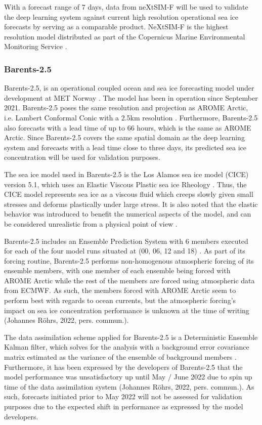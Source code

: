 \documentclass[../main/thesis.tex]{subfiles}
\begin{document}
With a forecast range of 7 days, data from neXtSIM-F will be used to validate the deep learning system against current high resolution operational sea ice forecasts by serving as a comparable product. NeXtSIM-F is the highest resolution model distributed as part of the Copernicus Marine Environmental Monitoring Service \citep{nextsimdata2020}.

\subsubsection{Barents-2.5}
\label{sec:barents}
Barents-2.5, is an operational coupled ocean and sea ice forecasting model under development at MET Norway \citep{Roehrs2022}. The model has been in operation since September 2021. Barents-2.5 poses the same resolution and projection as AROME Arctic, i.e. Lambert Conformal Conic with a 2.5km resolution \citep{Roehrs2022,Mueller2017}. Furthermore, Barents-2.5 also forecasts with a lead time of up to 66 hours, which is the same as AROME Arctic. Since Barents-2.5 covers the same spatial domain as the deep learning system and forecasts with a lead time close to three days, its predicted sea ice concentration will be used for validation purposes.

The sea ice model used in Barents-2.5 is the Los Alamos sea ice model (CICE) version 5.1, which uses an Elastic Viscous Plastic sea ice Rheology \citep{Hunke2015}. Thus, the CICE model represents sea ice as a viscous fluid which creeps slowly given small stresses and deforms plastically under large stress. It is also noted that the elastic behavior was introduced to benefit the numerical aspects of the model, and can be considered unrealistic from a physical point of view \citep{Hunke1997}.

Barents-2.5 includes an Ensemble Prediction System with 6 members executed for each of the four model runs situated at (00, 06, 12 and 18) \citep{Roehrs2022}. As part of its forcing routine, Barents-2.5 performs non-homogenous atmospheric forcing of its ensemble members, with one member of each ensemble being forced with AROME Arctic while the rest of the members are forced using atmospheric data from ECMWF. As such, the members forced with AROME Arctic seem to perform best with regards to ocean currents, but the atmospheric forcing's impact on sea ice concentration performance is unknown at the time of writing (Johannes Röhrs, 2022, pers. commun.).

The data assimilation scheme applied for Barents-2.5 is a Deterministic Ensemble Kalman filter, which solves for the analysis with a background error covariance matrix estimated as the variance of the ensemble of background members \citep{Roehrs2022}. Furthermore, it has been expressed by the developers of Barents-2.5 that the model performance was unsatisfactory up until May / June 2022 due to spin up time of the data assimilation system (Johannes Röhrs, 2022, pers. commun.). As such, forecasts initiated prior to May 2022 will not be assessed for validation purposes due to the expected shift in performance as expressed by the model developers.
\end{document}
